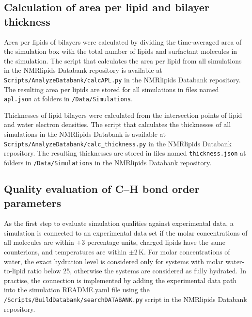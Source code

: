 \documentclass[fleqn,10pt]{wlscirep}
\begin{document}
\subsection{Calculation of area per lipid and bilayer thickness}
Area per lipids of bilayers were calculated by dividing the time-averaged area of the simulation box with the total number of lipids and surfactant molecules in the simulation. 
The script that calculates the area per lipid from all simulations in the NMRlipids Databank repository is available at \texttt{Scripts/AnalyzeDatabank/calcAPL.py} in the NMRlipids Databank repository. The resulting area per lipids are stored for all simulations in files named \texttt{apl.json} at folders in \texttt{/Data/Simulations}. 

Thicknesses of lipid bilayers were calculated from the intersection points of lipid and water electron densities. The script that calculates the thicknesses of all simulations in the NMRlipids Databank is available at \texttt{Scripts/AnalyzeDatabank/calc\_thickness.py} in the NMRlipids Databank repository. The resulting thicknesses are stored in files named \texttt{thickness.json} at folders in \texttt{/Data/Simulations} in the NMRlipids Databank repository. 

\subsection{Quality evaluation of C--H bond order parameters}
As the first step to evaluate simulation qualities against experimental data, a simulation is connected to an experimental data set if the molar concentrations of all molecules are within $\pm$3 percentage units, charged lipids have the same counterions, and temperatures are within $\pm$2\,K. For molar concentrations of water, the exact hydration level is considered only for systems with molar water-to-lipid ratio below 25, otherwise the systems are considered as fully hydrated. In practise, the connection is implemented by adding the experimental data path into the simulation README.yaml file using the \texttt{/Scripts/BuildDatabank/searchDATABANK.py} script in the NMRlipids Databank repository. 
\end{document}
